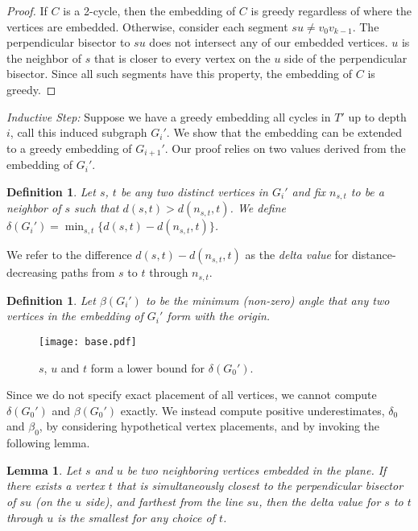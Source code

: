 \documentclass[11pt]{article}
\newtheorem{lemma}[theorem]{Lemma}
\newtheorem{definition}[theorem]{Definition}
\newcommand{\leaveout}[1]{#1}  \newcommand{\Leaveout}[2]{#1}  \else
\newcommand{\leaveout}[1]{ }
\newcommand{\Leaveout}[2]{#2}
\begin{document}
\leaveout{


\begin{proof} If $C$ is a 2-cycle, then 
the embedding of $C$ is greedy regardless of where the vertices are 
embedded. Otherwise, consider each segment $su\neq v_0v_{k-1}$. The 
perpendicular bisector to $su$ does not intersect any of our
embedded vertices. $u$ is the neighbor of $s$ that is closer to every vertex
on the $u$ side of the perpendicular bisector. Since all such segments have this
property, the embedding of $C$ is greedy.
\end{proof}
}

\emph{Inductive Step:}
Suppose we have a greedy embedding all cycles in $T'$ up to depth $i$,
call this induced subgraph $G_i'$. We show that the embedding can
be extended to a greedy embedding of $G_{i+1}'$. Our proof relies on 
two values derived from the embedding of $G_i'$. 

\begin{definition}
Let $s$, $t$ be any two distinct vertices in $G_i'$ and 
fix $n_{s,t}$ to be a neighbor of $s$ such that $d(s,t) > d(n_{s,t},t)$. 
We define $\delta(G_i')=\min_{s,t}\{d(s,t) - d(n_{s,t},t)\}$.
\end{definition}

We refer to the difference $d(s,t) - d(n_{s,t},t)$ as the \emph{delta value} 
for distance-decreasing paths from $s$ to $t$ through $n_{s,t}$.

\begin{definition}
Let $\beta(G_i')$ to be the minimum (non-zero) angle 
that any two vertices in the embedding of $G_i'$ form with the origin.
\end{definition}
\begin{figure}[!]
\vspace*{-28pt}
\begin{center}
\texttt{[image: base.pdf]}
\end{center}
\vspace*{-16pt}
\caption{$s$, $u$ and $t$ form a lower bound for $\delta(G_0')$.}
\vspace*{-16pt}
\label{fig:delta_0}
\end{figure}
Since we do not specify exact placement of all vertices, we cannot compute 
$\delta(G_0')$ and $\beta(G_0')$ exactly. We instead compute positive 
underestimates, $\delta_0$ and $\beta_0$, by considering hypothetical
vertex placements, and by invoking the following lemma.

\begin{lemma}
\label{lemma-delta}
Let $s$ and $u$ be two neighboring vertices embedded in the 
plane. If there exists a vertex $t$ that is simultaneously 
closest to the perpendicular bisector of $su$ (on the $u$ side), 
and farthest from the line $su$, then the delta value for $s$ to $t$
through $u$ is the smallest for any choice of $t$. 
\end{lemma}
\end{document}
